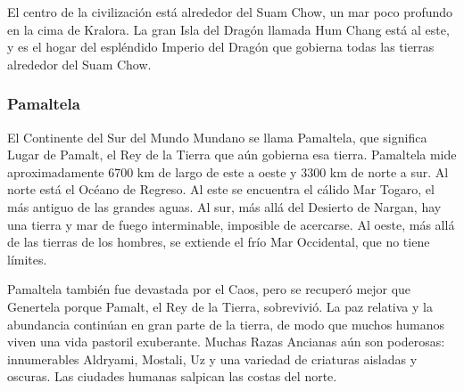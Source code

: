 El centro de la civilización está alrededor del Suam Chow, un mar poco profundo en la cima de Kralora. La gran Isla del Dragón llamada Hum Chang está al este, y es el hogar del espléndido Imperio del Dragón que gobierna todas las tierras alrededor del Suam Chow.

\subsubsection{Pamaltela}
El Continente del Sur del Mundo Mundano se llama Pamaltela, que significa Lugar de Pamalt, el Rey de la Tierra que aún gobierna esa tierra. Pamaltela mide aproximadamente 6700 km de largo de este a oeste y 3300 km de norte a sur. Al norte está el Océano de Regreso. Al este se encuentra el cálido Mar Togaro, el más antiguo de las grandes aguas. Al sur, más allá del Desierto de Nargan, hay una tierra y mar de fuego interminable, imposible de acercarse. Al oeste, más allá de las tierras de los hombres, se extiende el frío Mar Occidental, que no tiene límites. 

Pamaltela también fue devastada por el Caos, pero se recuperó mejor que Genertela porque Pamalt, el Rey de la Tierra, sobrevivió. La paz relativa y la abundancia continúan en gran parte de la tierra, de modo que muchos humanos viven una vida pastoril exuberante. Muchas Razas Ancianas aún son poderosas: innumerables Aldryami, Mostali, Uz y una variedad de criaturas aisladas y oscuras. Las ciudades humanas salpican las costas del norte.




